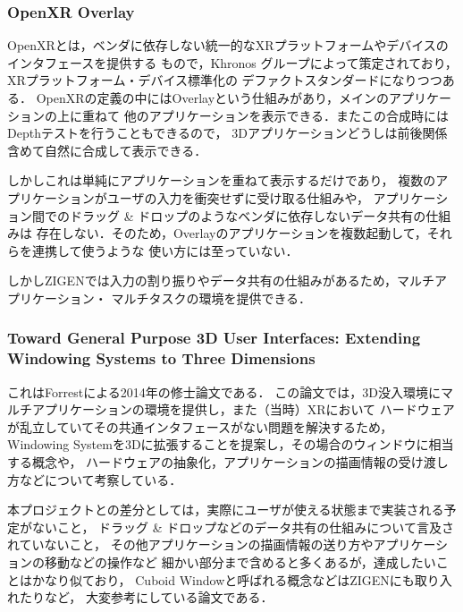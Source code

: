 \subsubsection{OpenXR Overlay}
\label{section:openxr-overlay}

OpenXRとは，ベンダに依存しない統一的なXRプラットフォームやデバイスのインタフェースを提供する
もので，Khronos グループによって策定されており，XRプラットフォーム・デバイス標準化の
デファクトスタンダードになりつつある．
OpenXRの定義の中にはOverlayという仕組みがあり，メインのアプリケーションの上に重ねて
他のアプリケーションを表示できる．またこの合成時にはDepthテストを行うこともできるので，
3Dアプリケーションどうしは前後関係含めて自然に合成して表示できる．

しかしこれは単純にアプリケーションを重ねて表示するだけであり，
複数のアプリケーションがユーザの入力を衝突せずに受け取る仕組みや，
アプリケーション間でのドラッグ \& ドロップのようなベンダに依存しないデータ共有の仕組みは
存在しない．そのため，Overlayのアプリケーションを複数起動して，それらを連携して使うような
使い方には至っていない．

しかしZIGENでは入力の割り振りやデータ共有の仕組みがあるため，マルチアプリケーション・
マルチタスクの環境を提供できる．

\subsubsection{
  Toward General Purpose 3D User Interfaces:
  Extending Windowing Systems to Three Dimensions \cite{forrest}
}
\label{section:forrest}

これはForrestによる2014年の修士論文である．
この論文では，3D没入環境にマルチアプリケーションの環境を提供し，また（当時）XRにおいて
ハードウェアが乱立していてその共通インタフェースがない問題を解決するため，
Windowing Systemを3Dに拡張することを提案し，その場合のウィンドウに相当する概念や，
ハードウェアの抽象化，アプリケーションの描画情報の受け渡し方などについて考察している．

本プロジェクトとの差分としては，実際にユーザが使える状態まで実装される予定がないこと，
ドラッグ \& ドロップなどのデータ共有の仕組みについて言及されていないこと，
その他アプリケーションの描画情報の送り方やアプリケーションの移動などの操作など
細かい部分まで含めると多くあるが，達成したいことはかなり似ており，
Cuboid Windowと呼ばれる概念などはZIGENにも取り入れたりなど，
大変参考にしている論文である．
